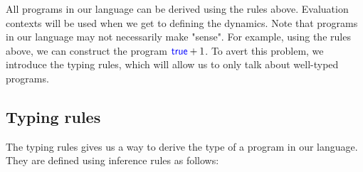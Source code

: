 \documentclass[twoside,11pt,openright]{report}
\theoremstyle{definition}
\newcommand{\Keyword}[1]{{\color{blue} \mathsf{#1}}}
\newcommand{\var}{x}
\newcommand{\expr}{e}
\newcommand{\TT}{()}
\newcommand{\Num}[1]{\overline{#1}}
\newcommand{\True}{\Keyword{true}}
\newcommand{\False}{\Keyword{false}}
\newcommand{\IfCmd}{\Keyword{if}}
\newcommand{\ThenCmd}{\Keyword{then}}
\newcommand{\ElseCmd}{\Keyword{else}}
\def\If#1then#2else#3{\IfCmd{}\;#1\;\ThenCmd{}\;#2\;\ElseCmd{}\;#3}
\newcommand{\Fst}{\Keyword{fst}\;}
\newcommand{\Tunit}{\mathsf{Unit}}
\newcommand{\Tint}{\mathbb{Z}}
\newcommand{\Tbool}{\mathbb{B}}
\newcommand{\Tprod}[2]{#1 \times #2}
\newcommand{\typ}{\tau}
\newcommand{\venv}{\Gamma}
\newcommand{\tenv}{\Xi}
\newcommand{\jdg}[4]{#1 \; | \; #2 \; \vdash #3 : #4}
\begin{document}
All programs in our language can be derived using the rules above. Evaluation contexts will be used when we get to defining the dynamics. Note that programs in our language may not necessarily make "sense". For example, using the rules above, we can construct the program $\True + 1$. To avert this problem, we introduce the typing rules, which will allow us to only talk about well-typed programs.

\subsection{Typing rules}
The typing rules gives us a way to derive the type of a program in our language. They are defined using inference rules as follows:
\end{document}
